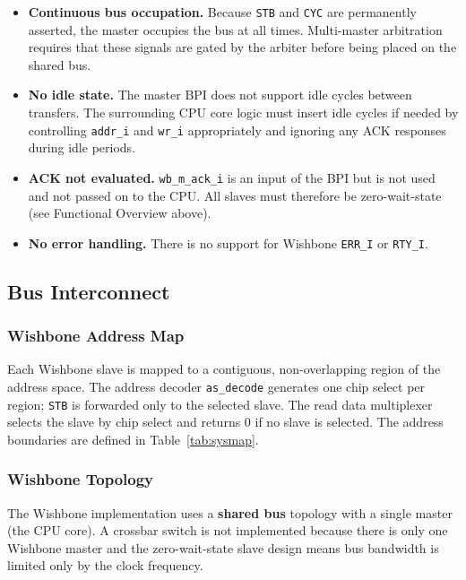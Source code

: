 \begin{itemize}
  \item \textbf{Continuous bus occupation.}
    Because \texttt{STB} and \texttt{CYC} are permanently asserted,
    the master occupies the bus at all times.
    Multi-master arbitration requires that these signals are gated
    by the arbiter before being placed on the shared bus.
  \item \textbf{No idle state.}
    The master BPI does not support idle cycles between transfers.
    The surrounding CPU core logic must insert idle cycles if needed
    by controlling \texttt{addr\_i} and \texttt{wr\_i} appropriately and
    ignoring any ACK responses during idle periods.
  \item \textbf{ACK not evaluated.}
    \texttt{wb\_m\_ack\_i} is an input of the BPI but is not used and not
    passed on to the CPU. All slaves must therefore be zero-wait-state
    (see Functional Overview above).
  \item \textbf{No error handling.}
    There is no support for Wishbone \texttt{ERR\_I} or \texttt{RTY\_I}.
\end{itemize}


\subsection{Bus Interconnect}
\label{subsec:asBusInterconnect}

\subsubsection{Wishbone Address Map}

Each Wishbone slave is mapped to a contiguous, non-overlapping region of
the address space. The address decoder \texttt{as\_decode} generates one
chip select per region; \texttt{STB} is forwarded only to the selected
slave. The read data multiplexer selects the slave by chip select and returns 0
if no slave is selected. The address boundaries are defined in
Table~\ref{tab:sysmap}.

\subsubsection{Wishbone Topology}

The Wishbone implementation uses a \textbf{shared bus} topology with a single
master (the CPU core). A crossbar switch is not implemented because there is
only one Wishbone master and the zero-wait-state slave design means bus
bandwidth is limited only by the clock frequency.

